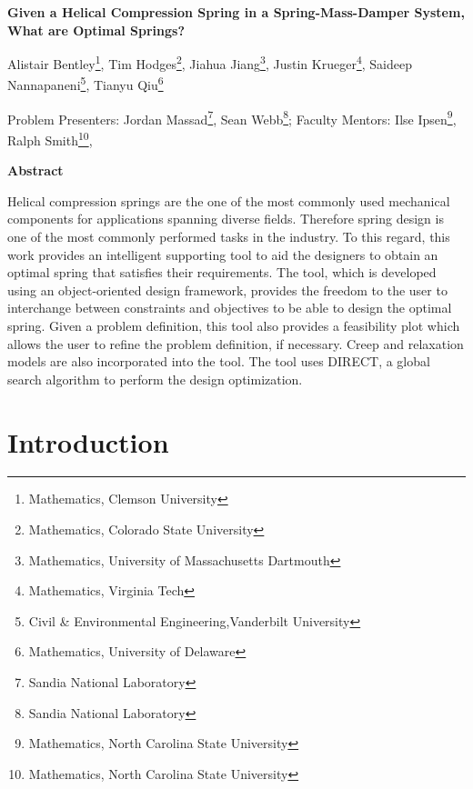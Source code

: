 \documentclass[10pt]{article}
\begin{document}
\centerline{\large \bf Given a Helical Compression Spring in a Spring-Mass-Damper System, What are Optimal Springs?}

\vspace{.1truein}

\def\thefootnote{\arabic{footnote}}
\begin{center}
  
  Alistair Bentley\footnote{Mathematics, Clemson University},
   Tim Hodges\footnote{Mathematics, Colorado State University},
   Jiahua Jiang\footnote{Mathematics, University of Massachusetts Dartmouth },
  Justin Krueger\footnote{Mathematics, Virginia Tech},
  Saideep Nannapaneni\footnote{Civil \& Environmental Engineering,Vanderbilt University},
  Tianyu Qiu\footnote{Mathematics, University of Delaware}
   
\end{center}



\begin{center}
Problem Presenters: Jordan Massad\footnote{Sandia National Laboratory},
Sean Webb\footnote{Sandia National Laboratory};
	Faculty Mentors: Ilse Ipsen\footnote{Mathematics, North Carolina State University},
	Ralph Smith\footnote{Mathematics, North Carolina State University}, 
\end{center}


\vspace{.3truein}
\centerline{\bf Abstract}
 Helical compression springs are the one of the most commonly used mechanical components for applications spanning diverse fields. Therefore spring design is one of the most commonly performed tasks in the industry. To this regard, this work provides an intelligent supporting tool to aid the designers to obtain an optimal spring that satisfies their requirements. The tool, which is developed using an object-oriented design framework, provides the freedom to the user to interchange between constraints and objectives to be able to design the optimal spring. Given a problem definition, this tool also provides a feasibility plot which allows the user to refine the problem definition, if necessary. Creep and relaxation models are also incorporated into the tool. The tool uses DIRECT, a global search algorithm to perform the design optimization.

\section{Introduction}
\label{sec:Introduction}
\end{document}
